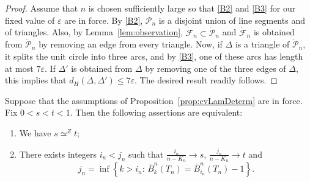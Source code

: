 \documentclass[10pt]{amsart}
\theoremstyle{definition}\newtheorem{defi}[theo]{Definition}\newtheorem{rema}[theo]{Remark}\newtheorem{exam}[theo]{Example}\newtheorem{exem}[theo]{Example}\newtheorem{nota}[theo]{Notation}
\def\dFn{\dot{\mathcal{F}}_{n}}
\def\dPn{\dot{\mathcal{P}}_{n}}
\def\oB{\overline{B}}
\renewcommand{\epsilon}{\varepsilon}
\begin{document}
\begin{proof}
Assume that $n$ is chosen sufficiently large so that \ref{B2} and \ref{B3} for our fixed value of $\epsilon$ are in force.
By \ref{B2}, $ \dPn$ is a disjoint union of line segments and of triangles. Also, by Lemma~\ref{lem:observation}, $ \dFn \subset \dPn$ and  $\dFn$ is obtained from $\dPn$ by removing an edge from every triangle. Now, if $ \Delta$ is a triangle of $\dPn$, it splits the unit circle into three arcs, and by \ref{B3}, one of these arcs has length at most $7 \epsilon$. If $ {\Delta}'$ is obtained from $\Delta$ by removing one of the three edges of $\Delta$, this implies that $d_{H}(\Delta,{\Delta}') \leq 7 \epsilon$. The desired result readily follows.
\end{proof}



\begin{lemma}
\label{lem:approxJ1}
Suppose that the assumptions of Proposition~\ref{prop:cvLamDeterm} are in force. Fix $0<s<t < 1$.
Then the following assertions are equivalent:
\begin{enumerate}
\item[(i)] We have $s \simeq^Z t$;
\item[(ii)] There exists integers $i_{n}< j_{n}$ such that $ \tfrac{i_{n}}{n-K_{n}} \rightarrow s$, $ \tfrac{j_{n}}{n-K_{n}} \rightarrow t$ and
\[ j_{n}= \inf \left\{k>i_{n}: \,  \oB^{n}_k(T_n)=\oB^{n}_{i_{n}}(T_n)-1 \right\}.\]
\end{enumerate}
\end{lemma}
\end{document}
